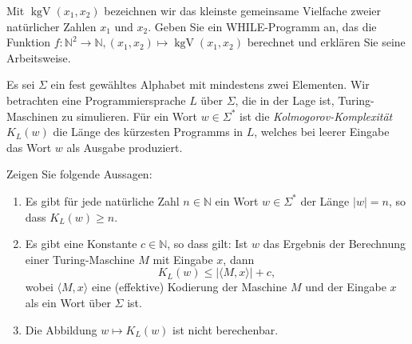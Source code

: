 \documentclass[german]{latteachCD}[2017/03/28]
\begin{document}
\begin{exercise}
  Mit $\operatorname{kgV}(x_{1}, x_{2})$ bezeichnen wir das kleinste gemeinsame Vielfache zweier
  natürlicher Zahlen $x_{1}$ und $x_{2}$.
  Geben Sie ein WHILE-Programm an, das die Funktion $f \colon \mathbb N^{2} \to
  \mathbb N, (x_{1}, x_{2}) \mapsto \operatorname{kgV}(x_{1}, x_{2})$
  berechnet und erklären Sie seine Arbeitsweise. 
\end{exercise}

\begin{exercise}
  Es sei $\Sigma$ ein fest gewähltes Alphabet mit mindestens zwei Elementen.
  Wir betrachten eine Programmiersprache $L$ über $\Sigma$, die in der Lage ist,
  Turing-Maschinen zu simulieren.  Für ein Wort $w \in \Sigma^{*}$ ist die
  \emph{Kolmogorov-Komplexität} $K_{L}(w)$ die Länge des kürzesten Programms in
  $L$, welches bei leerer Eingabe das Wort $w$ als Ausgabe produziert.

  Zeigen Sie folgende Aussagen:
  \begin{enumerate}
  \item Es gibt für jede natürliche Zahl $n \in \mathbb N$ ein Wort $w \in
    \Sigma^{*}$ der Länge $\lvert w\rvert = n$, so dass $K_{L}(w) \geq n$.
  \item Es gibt eine Konstante $c \in \mathbb N$, so dass gilt: Ist $w$ das
    Ergebnis der Berechnung einer Turing-Maschine $M$ mit Eingabe $x$, dann
    \begin{equation*}
      K_{L}(w) \leq \lvert\langle M,x\rangle\rvert + c,
    \end{equation*}
    wobei $\langle M,x\rangle$ eine (effektive) Kodierung der Maschine $M$ und
    der Eingabe $x$ als ein Wort über $\Sigma$ ist.
  \item Die Abbildung $w \mapsto K_{L}(w)$ ist nicht berechenbar.
  \end{enumerate}

\end{exercise}
\end{document}
